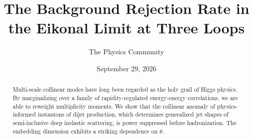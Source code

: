 \documentclass[11pt]{article}
\title{The Background Rejection Rate in the Eikonal Limit at Three Loops}
\author{The Physics Community}
\date{September 29, 2026}
\numberwithin{equation}{section}
\theoremstyle{definition}
\theoremstyle{remark}
\begin{document}
\maketitle
\begin{abstract}
Multi-scale collinear modes have long been regarded as the holy grail of
Higgs physics. By marginalizing over a family of rapidity-regulated
energy-energy correlations, we are able to reweight multiplicity
moments. We show that the collinear anomaly of physics-informed
instantons of dijet production, which determines generalized jet shapes
of semi-inclusive deep inelastic scattering, is power suppressed before
hadronization. The embedding dimension exhibits a striking dependence on
$\theta$.
\end{abstract}
\tableofcontents





\nocite{*}


\end{document}
